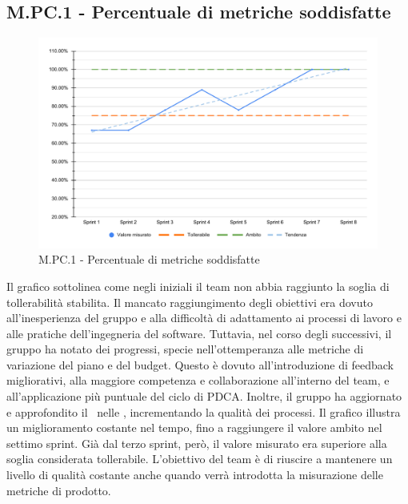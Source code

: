 \subsection{M.PC.1 - Percentuale di metriche soddisfatte}
\begin{figure}[H]
    \centering
    \includegraphics[width=\textwidth]{assets/metriche_soddisfatte.pdf}
    \caption{M.PC.1 - Percentuale di metriche soddisfatte}
\end{figure}

\par Il grafico sottolinea come negli  iniziali il team non abbia raggiunto la soglia di tollerabilità stabilita. Il mancato raggiungimento degli obiettivi era dovuto all’inesperienza del gruppo e alla difficoltà di adattamento ai processi di lavoro e alle pratiche dell’ingegneria del software. Tuttavia, nel corso degli  successivi, il gruppo ha notato dei progressi, specie nell’ottemperanza alle metriche di variazione del piano e del budget. Questo è dovuto all'introduzione di feedback migliorativi, alla maggiore competenza e collaborazione all'interno del team, e all’applicazione più puntuale del ciclo di PDCA. Inoltre, il gruppo ha aggiornato e approfondito il \WoW\ nelle \NdP, incrementando la qualità dei processi. Il grafico illustra un miglioramento costante nel tempo, fino a raggiungere il valore ambito nel settimo sprint. Già dal terzo sprint, però, il valore misurato era superiore alla soglia considerata tollerabile. L’obiettivo del team è di riuscire a mantenere un livello di qualità costante anche quando verrà introdotta la misurazione delle metriche di prodotto.
